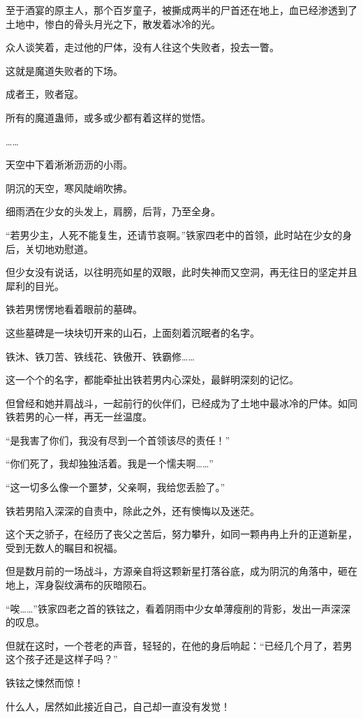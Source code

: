 \begin{this_body}
至于酒宴的原主人，那个百岁童子，被撕成两半的尸首还在地上，血已经渗透到了土地中，惨白的骨头月光之下，散发着冰冷的光。

众人谈笑着，走过他的尸体，没有人往这个失败者，投去一瞥。

这就是魔道失败者的下场。

成者王，败者寇。

所有的魔道蛊师，或多或少都有着这样的觉悟。

……

天空中下着淅淅沥沥的小雨。

阴沉的天空，寒风陡峭吹拂。

细雨洒在少女的头发上，肩膀，后背，乃至全身。

“若男少主，人死不能复生，还请节哀啊。”铁家四老中的首领，此时站在少女的身后，关切地劝慰道。

但少女没有说话，以往明亮如星的双眼，此时失神而又空洞，再无往日的坚定并且犀利的目光。

铁若男愣愣地看着眼前的墓碑。

这些墓碑是一块块切开来的山石，上面刻着沉眠者的名字。

铁沐、铁刀苦、铁线花、铁傲开、铁霸修……

这一个个的名字，都能牵扯出铁若男内心深处，最鲜明深刻的记忆。

但曾经和她并肩战斗，一起前行的伙伴们，已经成为了土地中最冰冷的尸体。如同铁若男的心一样，再无一丝温度。

“是我害了你们，我没有尽到一个首领该尽的责任！”

“你们死了，我却独独活着。我是一个懦夫啊……”

“这一切多么像一个噩梦，父亲啊，我给您丢脸了。”

铁若男陷入深深的自责中，除此之外，还有懊悔以及迷茫。

这个天之骄子，在经历了丧父之苦后，努力攀升，如同一颗冉冉上升的正道新星，受到无数人的瞩目和祝福。

但是数月前的一场战斗，方源亲自将这颗新星打落谷底，成为阴沉的角落中，砸在地上，浑身裂纹满布的灰暗陨石。

“唉……”铁家四老之首的铁铉之，看着阴雨中少女单薄瘦削的背影，发出一声深深的叹息。

但就在这时，一个苍老的声音，轻轻的，在他的身后响起：“已经几个月了，若男这个孩子还是这样子吗？”

铁铉之悚然而惊！

什么人，居然如此接近自己，自己却一直没有发觉！


\end{this_body}
